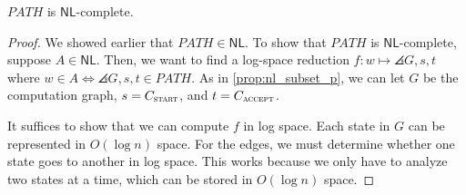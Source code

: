 \documentclass{standalone}
\begin{document}
\begin{theorem}
  \(\textit{PATH}\) is \(\mathsf{NL}\)-complete.
\end{theorem}
\begin{proof}
  We showed earlier that \(\textit{PATH} \in \mathsf{NL}\).
  To show that \(\textit{PATH}\) is \(\mathsf{NL}\)-complete,
  suppose \(A \in \mathsf{NL}\).
  Then, we want to find a log-space reduction
  \(f \colon w \mapsto \angles{G, s, t}\)
  where \(w \in A \iff \angles{G, s, t} \in \textit{PATH}\).
  As in \cref{prop:nl_subset_p}, we can let \(G\) be the computation graph,
  \(s = C_{\textsc{start}}\), and \(t = C_{\textsc{accept}}\).

  It suffices to show that we can compute \(f\) in log space.
  Each state in \(G\) can be represented in \(O(\log n)\) space.
  For the edges, we must determine
  whether one state goes to another in log space.
  This works because we only have to analyze two states at a time,
  which can be stored in \(O(\log n)\) space.
\end{proof}
\end{document}
